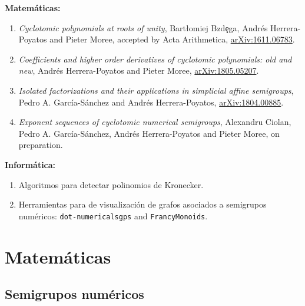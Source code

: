 \documentclass[10pt,compress]{beamer}
\begin{document}
\begin{frame}
\vspace{-4mm}
\begin{center}
\color{ChetwodeBlue}\large\textbf{Matemáticas:}  
\end{center}
\vspace{-3mm}
\begin{enumerate}
\item \emph{Cyclotomic polynomials at roots of unity}, Bart{\l}omiej Bzd\c{e}ga, Andrés Herrera-Poyatos and Pieter Moree, accepted by Acta Arithmetica, \href{https://arxiv.org/abs/1611.06783}{arXiv:1611.06783}.
\item\emph{ Coefficients and higher order derivatives of cyclotomic polynomials: old and new}, Andrés Herrera-Poyatos and Pieter Moree, \href{https://arxiv.org/abs/1805.05207}{arXiv:1805.05207}.
\item \emph{Isolated factorizations and their applications in simplicial affine semigroups}, Pedro A. García-Sánchez and Andrés Herrera-Poyatos, \href{https://arxiv.org/abs/1804.00885}{arXiv:1804.00885}.
\item \emph{Exponent sequences of cyclotomic numerical semigroups}, Alexandru Ciolan, Pedro A. García-Sánchez, Andrés Herrera-Poyatos and Pieter Moree, on preparation.
\end{enumerate}

\vspace{-5mm}
\begin{center}
\color{ChetwodeBlue}\large\textbf{Informática:}  
\end{center}
\vspace{-3mm}
\begin{enumerate}
\item Algoritmos para detectar polinomios de Kronecker.
\item Herramientas para de visualización de grafos asociados a semigrupos numéricos: \texttt{dot-numericalsgps} and \texttt{FrancyMonoids}.
\end{enumerate}  
\end{frame}

\section{Matemáticas}

\subsection{Semigrupos numéricos}
\end{document}
